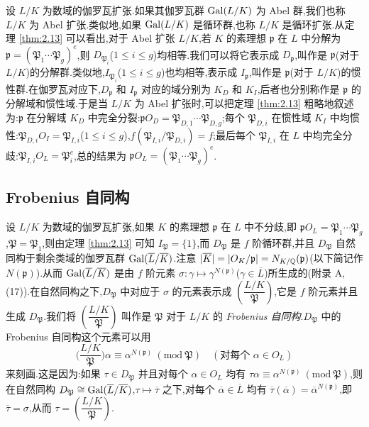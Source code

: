 \begin{remark}
设 $L/K$ 为数域的伽罗瓦扩张.如果其伽罗瓦群 $\operatorname{Gal}(L/K)$ 为 Abel 群,我们也称 $L/K$ 为 Abel 扩张.类似地,如果 $\operatorname{Gal}(L/K)$ 是循环群,也称 $L/K$ 是循环扩张.从定理 \ref{thm:2.13} 可以看出,对于 Abel 扩张 $L/K$,若 $K$ 的素理想 $\mathfrak{p}$ 在 $L$ 中分解为 $\mathfrak{p}=(\mathfrak{P}_1\cdots\mathfrak{P}_g)^e$,则 $D_{\mathfrak{P}_i}$($1\leqslant i\leqslant g$)均相等.我们可以将它表示成 $D_{\mathfrak{p}}$,叫作是 $\mathfrak{p}$(对于 $L/K$)的分解群.类似地,$I_{\mathfrak{P}_i}$($1\leqslant i\leqslant g$)也均相等,表示成 $I_{\mathfrak{p}}$,叫作是 $\mathfrak{p}$(对于 $L/K$)的惯性群.在伽罗瓦对应下,$D_{\mathfrak{p}}$ 和 $I_{\mathfrak{p}}$ 对应的域分别为 $K_D$ 和 $K_I$,后者也分别称作是 $\mathfrak{p}$ 的分解域和惯性域.于是当 $L/K$ 为 Abel 扩张时,可以把定理 \ref{thm:2.13} 粗略地叙述为:$\mathfrak{p}$ 在分解域 $K_D$ 中完全分裂:$\mathfrak{p}O_D=\mathfrak{P}_{D,1}\cdots\mathfrak{P}_{D,g}$;每个 $\mathfrak{P}_{D,i}$ 在惯性域 $K_I$ 中均惯性:$\mathfrak{P}_{D,i}O_I=\mathfrak{P}_{I,i}$($1\leqslant i\leqslant g$),$f(\mathfrak{P}_{I,i}/\mathfrak{P}_{D,i})=f$;最后每个 $\mathfrak{P}_{I,i}$ 在 $L$ 中均完全分歧:$\mathfrak{P}_{I,i}O_L=\mathfrak{P}_i^e$,总的结果为 $\mathfrak{p}O_L=(\mathfrak{P}_1\cdots\mathfrak{P}_g)^e$.
\end{remark}

\subsection{Frobenius 自同构}\label{sec:ch2-s3-3}

设 $L/K$ 为数域的伽罗瓦扩张,如果 $K$ 的素理想 $\mathfrak{p}$ 在 $L$ 中不分歧,即 $\mathfrak{p}O_L=\mathfrak{P}_1\cdots\mathfrak{P}_g$,$\mathfrak{P}=\mathfrak{P}_1$,则由定理 \ref{thm:2.13} 可知 $I_{\mathfrak{P}}=\{1\}$,而 $D_{\mathfrak{P}}$ 是 $f$ 阶循环群,并且 $D_{\mathfrak{P}}$ 自然同构于剩余类域的伽罗瓦群 $\operatorname{Gal}(\overline{L}/\overline{K})$.注意 $|\overline{K}|=|O_K/\mathfrak{p}|=N_{K/\mathbb{Q}}(\mathfrak{p})$(以下简记作 $N(\mathfrak{p})$).从而 $\operatorname{Gal}(\overline{L}/\overline{K})$ 是由 $f$ 阶元素 $\sigma\colon\gamma\mapsto\gamma^{N(\mathfrak{p})}$($\gamma\in\overline{L}$)所生成的(附录 A, (17)).在自然同构之下,$D_{\mathfrak{P}}$ 中对应于 $\sigma$ 的元素表示成 $\left(\dfrac{L/K}{\mathfrak{P}}\right)$,它是 $f$ 阶元素并且生成 $D_{\mathfrak{P}}$.我们将 $\left(\dfrac{L/K}{\mathfrak{P}}\right)$ 叫作是 $\mathfrak{P}$ 对于 $L/K$ 的 \emph{Frobenius 自同构}.$D_{\mathfrak{P}}$ 中的 Frobenius 自同构这个元素可以用
\[
  \Big(\frac{L/K}{\mathfrak{P}}\Big)\alpha\equiv\alpha^{N(\mathfrak{p})}\ (\mathrm{mod}\ \mathfrak{P})\quad (\text{对每个 }\alpha\in O_L)
\]
来刻画.这是因为:如果 $\tau\in D_{\mathfrak{P}}$ 并且对每个 $\alpha\in O_L$ 均有 $\tau\alpha\equiv\alpha^{N(\mathfrak{p})}\ (\mathrm{mod}\ \mathfrak{P})$,则在自然同构 $D_{\mathfrak{P}}\cong\operatorname{Gal}(\overline{L}/\overline{K})$,$\tau\mapsto\overline{\tau}$ 之下,对每个 $\overline{\alpha}\in\overline{L}$ 均有 $\overline{\tau}(\overline{\alpha})=\overline{\alpha}^{N(\mathfrak{p})}$,即 $\overline{\tau}=\sigma$,从而 $\tau=\left(\dfrac{L/K}{\mathfrak{P}}\right)$.

